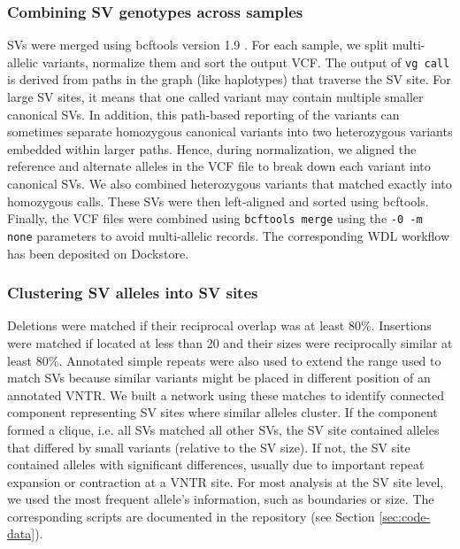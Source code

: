 \documentclass[11pt]{ucscthesis}
\begin{document}
\subsubsection{Combining SV genotypes across samples}
\label{subsec:svcombining}

SVs were merged using bcftools version 1.9 \cite{li_samtools_2011}.
For each sample, we split multi-allelic variants, normalize them and sort the output VCF.
The output of \texttt{vg~call} is derived from paths in the graph (like haplotypes) that traverse the SV site.
For large SV sites, it means that one called variant may contain multiple smaller canonical SVs.
In addition, this path-based reporting of the variants can sometimes separate homozygous canonical variants into two heterozygous variants embedded within larger paths.
Hence, during normalization, we aligned the reference and alternate alleles in the VCF file to break down each variant into canonical SVs.
We also combined heterozygous variants that matched exactly into homozygous calls.
These SVs were then left-aligned and sorted using bcftools.
Finally, the VCF files were combined using \texttt{bcftools merge} using the \verb~-0 -m none~ parameters to avoid multi-allelic records.
The corresponding WDL workflow has been deposited on Dockstore\cite{svmerge_dockstore}.

\subsubsection{Clustering SV alleles into SV sites}
\label{subsec:svclustering}

Deletions were matched if their reciprocal overlap was at least 80\%.
Insertions were matched if located at less than 20 and their sizes were reciprocally similar at least 80\%.
Annotated simple repeats were also used to extend the range used to match SVs because similar variants might be placed in different position of an annotated VNTR.
We built a network using these matches to identify connected component representing SV sites where similar alleles cluster.
If the component formed a clique, i.e. all SVs matched all other SVs, the SV site contained alleles that differed by small variants (relative to the SV size).
If not, the SV site contained alleles with significant differences, usually due to important repeat expansion or contraction at a VNTR site.
For most analysis at the SV site level, we used the most frequent allele's information, such as boundaries or size.
The corresponding scripts are documented in the repository (see Section \ref{sec:code-data}).
\end{document}
